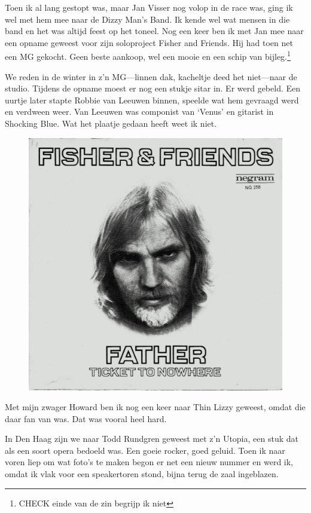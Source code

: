 \documentclass[10pt,twoside, openright]{memoir}
\begin{document}
Toen ik al lang gestopt was, maar Jan Visser nog volop in de race was, ging ik wel met hem mee naar de Dizzy Man's Band. Ik kende wel wat mensen in die band en het was altijd feest op het toneel. Nog een keer ben ik met Jan mee naar een opname geweest voor zijn soloproject Fisher and Friends. Hij had toen net een MG gekocht. Geen beste aankoop, wel een mooie en een schip van bijleg.\footnote{CHECK einde van de zin begrijp ik niet} 

We reden in de winter in z’n MG---linnen dak, kacheltje deed het niet---naar de studio. Tijdens de opname moest er nog een stukje sitar in. Er werd gebeld. Een uurtje later stapte Robbie van Leeuwen binnen, speelde wat hem gevraagd werd en verdween weer. Van Leeuwen was componist van ‘Venus’ en gitarist in Shocking Blue. Wat het plaatje gedaan heeft weet ik niet.

\begin{figure}
\includegraphics[width=\textwidth]{img/ch31/ff}
\end{figure}

Met mijn zwager Howard ben ik nog een keer naar Thin Lizzy geweest, omdat die daar fan van was. Dat was vooral heel hard. 

In Den Haag zijn we naar Todd Rundgren geweest met z’n Utopia, een stuk dat als een soort opera bedoeld was. Een goeie rocker, goed geluid. Toen ik naar voren liep om wat foto's te maken begon er net een nieuw nummer en werd ik, omdat ik vlak voor een speakertoren stond, bijna terug de zaal ingeblazen.
\end{document}
